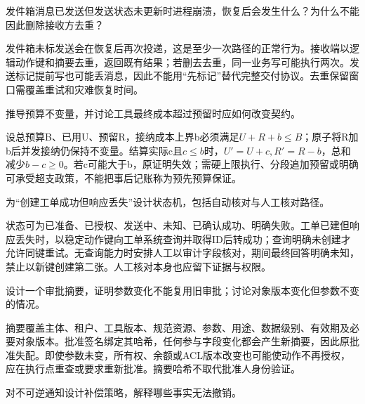 \begin{exercises}
\begin{exercise} 发件箱消息已发送但发送状态未更新时进程崩溃，恢复后会发生什么？为什么不能因此删除接收方去重？

\begin{solution}
发件箱未标发送会在恢复后再次投递，这是至少一次路径的正常行为。接收端以逻辑动作键和摘要去重，返回既有结果；若删去去重，同一业务写可能执行两次。发送标记提前写也可能丢消息，因此不能用“先标记”替代完整交付协议。去重保留窗口需覆盖重试和灾难恢复时间。
\end{solution}
\end{exercise}

\begin{exercise} 推导预算不变量，并讨论工具最终成本超过预留时应如何改变契约。

\begin{solution}
设总预算B、已用U、预留R，接纳成本上界b必须满足$U+R+b\le B$；原子将R加b后并发接纳仍保持不变量。结算实际c且$c\le b$时，$U'=U+c,R'=R-b$，总和减少$b-c\ge0$。若c可能大于b，原证明失效；需硬上限执行、分段追加预留或明确可承受超支政策，不能把事后记账称为预先预算保证。
\end{solution}
\end{exercise}

\begin{exercise} 为“创建工单成功但响应丢失”设计状态机，包括自动核对与人工核对路径。

\begin{solution}
状态可为已准备、已授权、发送中、未知、已确认成功、明确失败。工单已建但响应丢失时，以稳定动作键向工单系统查询并取得ID后转成功；查询明确未创建才允许同键重试。无查询能力时安排人工以审计字段核对，期间最终回答明确未知，禁止以新键创建第二张。人工核对本身也应留下证据与权限。
\end{solution}
\end{exercise}

\begin{exercise} 设计一个审批摘要，证明参数变化不能复用旧审批；讨论对象版本变化但参数不变的情况。

\begin{solution}
摘要覆盖主体、租户、工具版本、规范资源、参数、用途、数据级别、有效期及必要对象版本。批准签名绑定其哈希，任何参与字段变化都会产生新摘要，因此原批准失配。即使参数未变，所有权、余额或ACL版本改变也可能使动作不再授权，应在执行点重查或要求重新批准。摘要哈希不取代批准人身份验证。
\end{solution}
\end{exercise}

\begin{exercise} 对不可逆通知设计补偿策略，解释哪些事实无法撤销。


\end{exercise}
\end{exercises}
